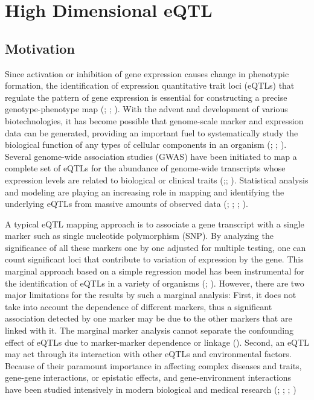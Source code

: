 \documentclass[11pt,]{book}
\theoremstyle{definition}
\theoremstyle{definition}
\theoremstyle{remark}
\begin{document}
\chapter{High Dimensional eQTL}\label{highdeqtl}

\section{Motivation}\label{motivation}

Since activation or inhibition of gene expression causes change in
phenotypic formation, the identification of expression quantitative
trait loci (eQTLs) that regulate the pattern of gene expression is
essential for constructing a precise genotype-phenotype map
(\cite{emilsson2008genetics}; \cite{cookson2009mapping};
\cite{nica2013expression}). With the advent and development of various
biotechnologies, it has become possible that genome-scale marker and
expression data can be generated, providing an important fuel to
systematically study the biological function of any types of cellular
components in an organism (\cite{kim2014meta}; \cite{fairfax2014innate};
\cite{lee2014common}). Several genome-wide association studies (GWAS)
have been initiated to map a complete set of eQTLs for the abundance of
genome-wide transcripts whose expression levels are related to
biological or clinical traits
(\cite{nica2013expression};\cite{li2013using};
\cite{koopmann2014genome}). Statistical analysis and modeling are
playing an increasing role in mapping and identifying the underlying
eQTLs from massive amounts of observed data
(\cite{kendziorski2006statistical}; \cite{chun2009expression};
\cite{sun2012statistical}; \cite{flutre2013statistical}).

A typical eQTL mapping approach is to associate a gene transcript with a
single marker such as single nucleotide polymorphism (SNP). By analyzing
the significance of all these markers one by one adjusted for multiple
testing, one can count significant loci that contribute to variation of
expression by the gene. This marginal approach based on a simple
regression model has been instrumental for the identification of eQTLs
in a variety of organisms (\cite{rockman2010selection};
\cite{kim2014meta}). However, there are two major limitations for the
results by such a marginal analysis: First, it does not take into
account the dependence of different markers, thus a significant
association detected by one marker may be due to the other markers that
are linked with it. The marginal marker analysis cannot separate the
confounding effect of eQTLs due to marker-marker dependence or linkage
(\cite{wu2007statistical}). Second, an eQTL may act through its
interaction with other eQTLs and environmental factors. Because of their
paramount importance in affecting complex diseases and traits, gene-gene
interactions, or epistatic effects, and gene-environment interactions
have been studied intensively in modern biological and medical research
(\cite{cheverud1995epistasis}; \cite{moore2003ubiquitous};
\cite{van2010detection}; \cite{mackay2014epistasis})
\end{document}
